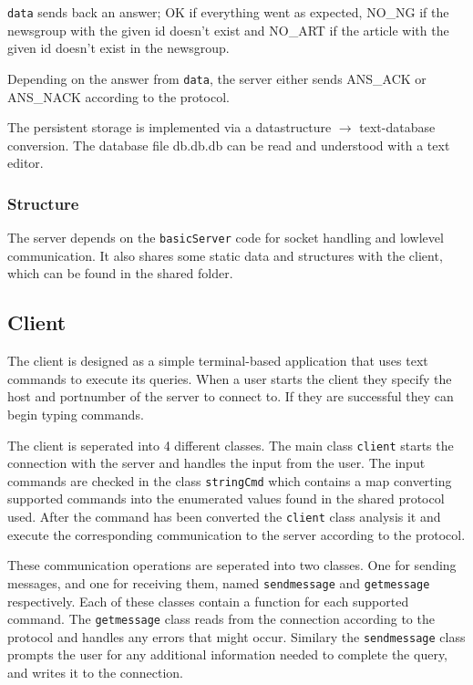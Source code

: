 \documentclass[12pt]{article}
\begin{document}
\verb!data! sends back an answer; OK if everything went as expected, NO\_NG if the newsgroup with the given id doesn't exist and NO\_ART if the article with the given id doesn't exist in the newsgroup.

Depending on the answer from \verb!data!, the server either sends ANS\_ACK or ANS\_NACK according to the protocol.

The persistent storage is implemented via a datastructure $\rightarrow$ text-database conversion. The database file db.db.db can be read and understood with a text editor.

\subsubsection*{Structure}
The server depends on the \verb!basicServer! code for socket handling and lowlevel communication.
It also shares some static data and structures with the client, which can be found in the shared folder.


\subsection*{Client}
The client is designed as a simple terminal-based application that uses text commands to execute its queries. When a user starts the client they specify the host and portnumber of the server to connect to. If they are successful they can begin typing commands.

The client is seperated into 4 different classes. The main class \verb!client! starts the connection with the server and handles the input from the user. The input commands are checked in the class \verb!stringCmd! which contains a map converting supported commands into the enumerated values found in the shared protocol used. After the command has been converted the \verb!client! class analysis it and execute the corresponding communication to the server according to the protocol.

These communication operations are seperated into two classes. One for sending messages, and one for receiving them, named \verb!sendmessage! and \verb!getmessage! respectively. Each of these classes contain a function for each supported command. The \verb!getmessage! class reads from the connection according to the protocol and handles any errors that might occur. Similary the \verb!sendmessage! class prompts the user for any additional information needed to complete the query, and writes it to the connection.
\end{document}
